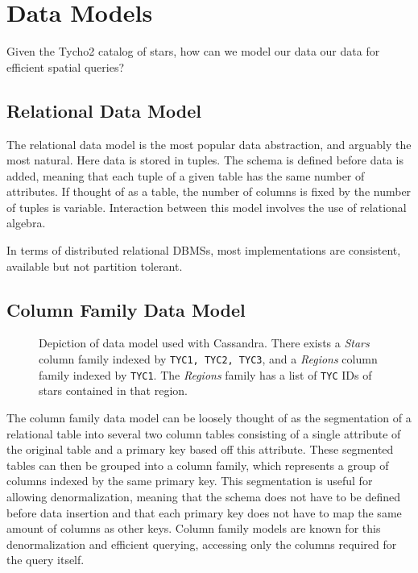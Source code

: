 \section{Data Models}\label{sec:dataModels}
Given the Tycho2 catalog of stars, how can we model our data our data for efficient spatial queries?

\subsection{Relational Data Model}\label{subsec:relationalDataModel}
The relational data model is the most popular data abstraction, and arguably the most natural.
Here data is stored in tuples.
The schema is defined before data is added, meaning that each tuple of a given table has the same number of attributes.
If thought of as a table, the number of columns is fixed by the number of tuples is variable.
Interaction between this model involves the use of relational algebra.

In terms of distributed relational DBMSs, most implementations are consistent, available but not partition tolerant.

\subsection{Column Family Data Model}\label{subsec:columnFamilyDataModel}
\begin{figure}
    \caption{Depiction of data model used with Cassandra.
    There exists a \textit{Stars} column family indexed by \texttt{TYC1, TYC2, TYC3}, and a \textit{Regions} column
    family indexed by \texttt{TYC1}.
    The \textit{Regions} family has a list of \texttt{TYC} IDs of stars contained in that region.}
    \label{fig:cassandraDataModel}
\end{figure}

The column family data model can be loosely thought of as the segmentation of a relational table into several two
column tables consisting of a single attribute of the original table and a primary key based off this attribute.
These segmented tables can then be grouped into a column family, which represents a group of columns indexed by the
same primary key.
This segmentation is useful for allowing denormalization, meaning that the schema does not have to be defined before
data insertion and that each primary key does not have to map the same amount of columns as other keys.
Column family models are known for this denormalization and efficient querying, accessing only the columns required for
the query itself.

